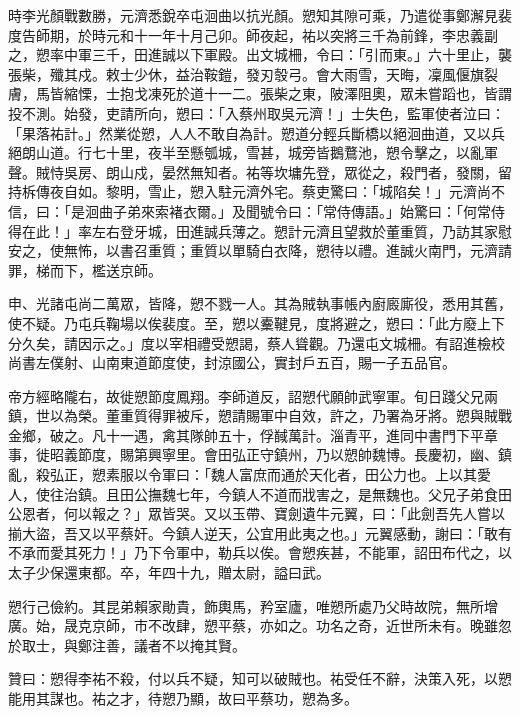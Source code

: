 \begin{pinyinscope}
 時李光顏戰數勝，元濟悉銳卒屯洄曲以抗光顏。愬知其隙可乘，乃遣從事鄭澥見裴度告師期，於時元和十一年十月己卯。師夜起，祐以突將三千為前鋒，李忠義副之，愬率中軍三千，田進誠以下軍殿。出文城柵，令曰：「引而東。」六十里止，襲張柴，殲其戍。敕士少休，益治鞍鎧，發刃彀弓。會大雨雪，天晦，凜風偃旗裂膚，馬皆縮慄，士抱戈凍死於道十一二。張柴之東，陂澤阻奧，眾未嘗蹈也，皆謂投不測。始發，吏請所向，愬曰：「入蔡州取吳元濟！」士失色，監軍使者泣曰：「果落祐計。」然業從愬，人人不敢自為計。愬道分輕兵斷橋以絕洄曲道，又以兵絕朗山道。行七十里，夜半至懸瓠城，雪甚，城旁皆鵝鶩池，愬令擊之，以亂軍聲。賊恃吳房、朗山戍，晏然無知者。祐等坎墉先登，眾從之，殺門者，發關，留持柝傳夜自如。黎明，雪止，愬入駐元濟外宅。蔡吏驚曰：「城陷矣！」元濟尚不信，曰：「是洄曲子弟來索褚衣爾。」及聞號令曰：「常侍傳語。」始驚曰：「何常侍得在此！」率左右登牙城，田進誠兵薄之。愬計元濟且望救於董重質，乃訪其家慰安之，使無怖，以書召重質；重質以單騎白衣降，愬待以禮。進誠火南門，元濟請罪，梯而下，檻送京師。



 申、光諸屯尚二萬眾，皆降，愬不戮一人。其為賊執事帳內廚廄廝役，悉用其舊，使不疑。乃屯兵鞠場以俟裴度。至，愬以櫜鞬見，度將避之，愬曰：「此方廢上下分久矣，請因示之。」度以宰相禮受愬謁，蔡人聳觀。乃還屯文城柵。有詔進檢校尚書左僕射、山南東道節度使，封涼國公，實封戶五百，賜一子五品官。



 帝方經略隴右，故徙愬節度鳳翔。李師道反，詔愬代願帥武寧軍。旬日踐父兄兩鎮，世以為榮。董重質得罪被斥，愬請賜軍中自效，許之，乃署為牙將。愬與賊戰金鄉，破之。凡十一遇，禽其隊帥五十，俘馘萬計。淄青平，進同中書門下平章事，徙昭義節度，賜第興寧里。會田弘正守鎮州，乃以愬帥魏博。長慶初，幽、鎮亂，殺弘正，愬素服以令軍曰：「魏人富庶而通於天化者，田公力也。上以其愛人，使往治鎮。且田公撫魏七年，今鎮人不道而戕害之，是無魏也。父兄子弟食田公恩者，何以報之？」眾皆哭。又以玉帶、寶劍遺牛元翼，曰：「此劍吾先人嘗以揃大盜，吾又以平蔡奸。今鎮人逆天，公宜用此夷之也。」元翼感動，謝曰：「敢有不承而愛其死力！」乃下令軍中，勒兵以俟。會愬疾甚，不能軍，詔田布代之，以太子少保還東都。卒，年四十九，贈太尉，謚曰武。



 愬行己儉約。其昆弟賴家勛貴，飾輿馬，矜室廬，唯愬所處乃父時故院，無所增廣。始，晟克京師，市不改肆，愬平蔡，亦如之。功名之奇，近世所未有。晚雖忽於取士，與鄭注善，議者不以掩其賢。



 贊曰：愬得李祐不殺，付以兵不疑，知可以破賊也。祐受任不辭，決策入死，以愬能用其謀也。祐之才，待愬乃顯，故曰平蔡功，愬為多。




\end{pinyinscope}
